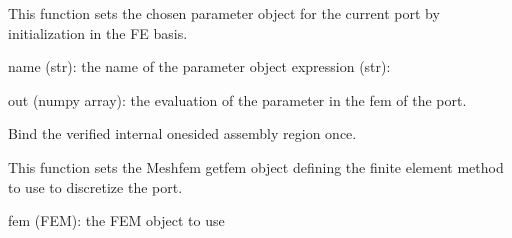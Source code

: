 \documentclass[letterpaper,10pt,english]{sphinxmanual}
\begin{document}
\begin{fulllineitems}
\begin{fulllineitems}
\begin{description}
\end{description}

\end{fulllineitems}


\begin{fulllineitems}
\label{\detokenize{scrimp:scrimp.port.Port.init_parameter}}
\pysigstartsignatures
\pysiglinewithargsret
{}
{\sphinxparamcomma {}}
{}
\pysigstopsignatures
\sphinxAtStartPar
This function sets the chosen parameter object for the current port by initialization in the FE basis.
\begin{description}
\sphinxAtStartPar
name (str): the name of the parameter object
expression (str):

\sphinxAtStartPar
out (numpy array): the evaluation of the parameter in the fem of the port.

\end{description}

\end{fulllineitems}


\begin{fulllineitems}
\label{\detokenize{scrimp:scrimp.port.Port.set_assembly_region}}
\pysigstartsignatures
\pysiglinewithargsret
{}
{}
{}
\pysigstopsignatures
\sphinxAtStartPar
Bind the verified internal one\sphinxhyphen{}sided assembly region once.

\end{fulllineitems}


\begin{fulllineitems}
\label{\detokenize{scrimp:scrimp.port.Port.set_fem}}
\pysigstartsignatures
\pysiglinewithargsret
{}
{}
{}
\pysigstopsignatures
\sphinxAtStartPar
This function sets the Meshfem getfem object defining the finite element method to use to discretize the port.
\begin{description}
\sphinxAtStartPar
fem (FEM): the FEM object to use


\end{description}
\end{fulllineitems}
\end{fulllineitems}
\end{document}
